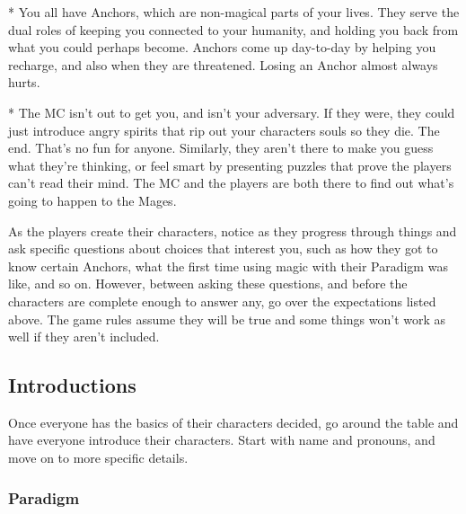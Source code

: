 \documentclass[
  oneside,
  statementpaper,
  9pt]{memoir}
\begin{document}
\begin{Player}
* You all have Anchors, which are non-magical parts of your lives. They serve the dual roles of keeping you connected to your humanity, and holding you back from what you could perhaps become. Anchors come up day-to-day by helping you recharge, and also when they are threatened. Losing an Anchor almost always hurts.

* The MC isn’t out to get you, and isn’t your adversary. If they were, they could just introduce angry spirits that rip out your characters souls so they die. The end. That’s no fun for anyone. Similarly, they aren’t there to make you guess what they’re thinking, or feel smart by presenting puzzles that prove the players can’t read their mind. The MC and the players are both there to find out what’s going to happen to the Mages.

\end{Player}

\begin{MC}

As the players create their characters, notice as they progress through things and ask specific questions about choices that interest you, such as how they got to know certain Anchors, what the first time using magic with their Paradigm was like, and so on. However, between asking these questions, and before the characters are complete enough to answer any, go over the expectations listed above. The game rules assume they will be true and some things won't work as well if they aren't included.

\end{MC}

\hypertarget{introductions}{%
\subsection{Introductions}\label{introductions}}

\begin{MC}

Once everyone has the basics of their characters decided, go around the table and have everyone introduce their characters. Start with name and pronouns, and move on to more specific details.

\end{MC}

\hypertarget{paradigm-2}{%
\subsubsection{Paradigm}\label{paradigm-2}}
\end{document}
